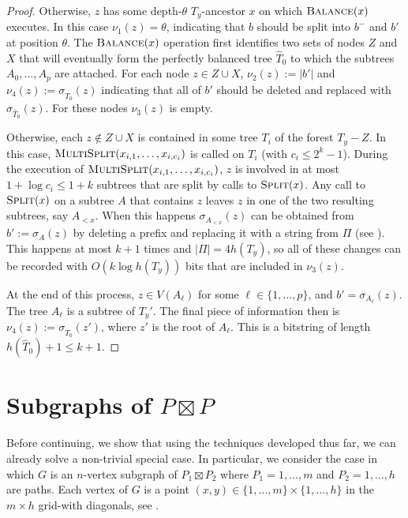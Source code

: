 \documentclass[kpfonts]{patmorin}
\let\le\leqslant
\begin{document}
\begin{proof}
  Otherwise, $z$ has some depth-$\theta$ $T_y$-ancestor $x$ on which $\textsc{Balance}(x)$ executes. In this case $\nu_{1}(z)=\theta$, indicating that $b$ should be split into $b^-$ and $b'$ at position $\theta$.  
  The $\textsc{Balance}(x)$ operation first identifies two sets of nodes $Z$ and $X$ that will eventually form the perfectly balanced tree $\hat{T}_0$ to which the subtrees $A_0,\ldots,A_p$ are attached.  For each node $z\in Z\cup X$, $\nu_{2}(z):=|b'|$ and $\nu_{4}(z):=\sigma_{\hat{T}_0}(z)$ indicating that all of $b'$ should be deleted and replaced with $\sigma_{\hat{T}_0}(z)$.  For these nodes $\nu_3(z)$ is empty.
    
  Otherwise, each $z\not\in Z\cup X$ is contained in some tree $T_i$ of the forest $T_y-Z$.  In this case, $\textsc{MultiSplit}(x_{i,1},\ldots,x_{i,c_i})$ is called on $T_i$ (with $c_i\le 2^k-1$).  During the execution of $\textsc{MultiSplit}(x_{i,1},\ldots,x_{i,c_i})$, $z$ is involved in at most $1+\log c_i\le 1+k$ subtrees that are split by calls to $\textsc{Split}(x)$.  Any call to $\textsc{Split}(x)$ on a subtree $A$ that contains $z$ leaves $z$ in one of the two resulting subtrees, say $A_{<x}$.  When this happens $\sigma_{A_{<x}}(z)$ can be obtained from $b':=\sigma_{A}(z)$ by deleting a prefix and replacing it with a string from $\Pi$ (see ).  This happens at most $k+1$ times and $|\Pi|= 4h(T_y)$, so all of these changes can be recorded with $O(k\log h(T_y))$ bits that are included in $\nu_{3}(z)$.
  
  At the end of this process, $z\in V(A_\ell)$ for some $\ell\in\{1,\ldots,p\}$, and $b'=\sigma_{A_\ell}(z)$.  The tree $A_\ell$ is a subtree of $T_y'$.  The final piece of information then is $\nu_4(z):=\sigma_{\hat{T}_0}(z')$, where $z'$ is the root of $A_\ell$.  This is a bitstring of length $h(\hat{T}_0)+1\le k+1$.
\end{proof}

\section{Subgraphs of $P\boxtimes P$}

Before continuing, we show that using the techniques developed thus far, we can already solve a non-trivial special case.  In particular, we consider the case in which $G$ is an $n$-vertex subgraph of $P_1\boxtimes P_2$ where $P_1=1,\ldots,m$ and $P_2=1,\ldots,h$ are paths. Each vertex of $G$ is a point $(x,y)\in\{1,\ldots,m\}\times \{1,\ldots,h\}$ in the $m\times h$ grid-with diagonals, see .
\end{document}
